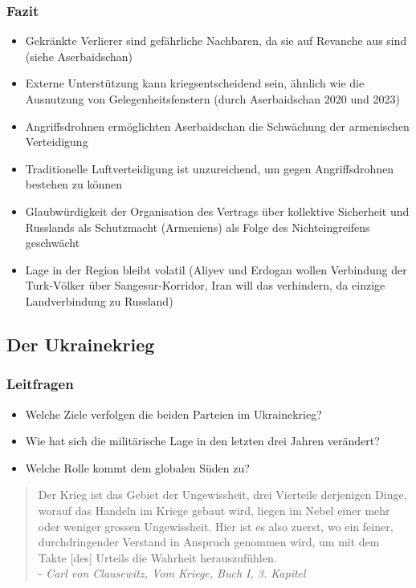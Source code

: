 {}\documentclass[a4paper]{article}
\providecommand{\tightlist}{\setlength{\itemsep}{1mm}\setlength{\parskip}{1mm}}
\begin{document}
\subsubsection{Fazit}\label{fazit-4}

\begin{itemize}
	\tightlist
	\item
	      Gekränkte Verlierer sind gefährliche Nachbaren, da sie auf Revanche
	      aus sind (siehe Aserbaidschan)
	\item
	      Externe Unterstützung kann kriegsentscheidend sein, ähnlich wie die
	      Ausnutzung von Gelegenheitsfenstern (durch Aserbaidschan 2020 und
	      2023)
	\item
	      Angriffsdrohnen ermöglichten Aserbaidschan die Schwächung der
	      armenischen Verteidigung
	\item
	      Traditionelle Luftverteidigung ist unzureichend, um gegen
	      Angriffsdrohnen bestehen zu können
	\item
	      Glaubwürdigkeit der Organisation des Vertrags über kollektive
	      Sicherheit und Russlands als Schutzmacht (Armeniens) als Folge des
	      Nichteingreifens geschwächt
	\item
	      Lage in der Region bleibt volatil (Aliyev und Erdogan wollen
	      Verbindung der Turk-Völker über Sangesur-Korridor, Iran will das
	      verhindern, da einzige Landverbindung zu Russland)
\end{itemize}

\subsection{Der Ukrainekrieg}\label{der-ukrainekrieg}

\subsubsection{Leitfragen}\label{leitfragen-9}

\begin{itemize}
	\tightlist
	\item
	      Welche Ziele verfolgen die beiden Parteien im Ukrainekrieg?
	\item
	      Wie hat sich die militärische Lage in den letzten drei Jahren
	      verändert?
	\item
	      Welche Rolle kommt dem globalen Süden zu?
\end{itemize}

\begin{quote}
	Der Krieg ist das Gebiet der Ungewissheit, drei Vierteile derjenigen
	Dinge, worauf das Handeln im Kriege gebaut wird, liegen im Nebel einer
	mehr oder weniger grossen Ungewissheit. Hier ist es also zuerst, wo ein
	feiner, durchdringender Verstand in Anspruch genommen wird, um mit dem
	Takte {[}des{]} Urteils die Wahrheit herauszufühlen.\\
	- \emph{Carl von Clausewitz, Vom Kriege, Buch I, 3. Kapitel}
\end{quote}
\end{document}
